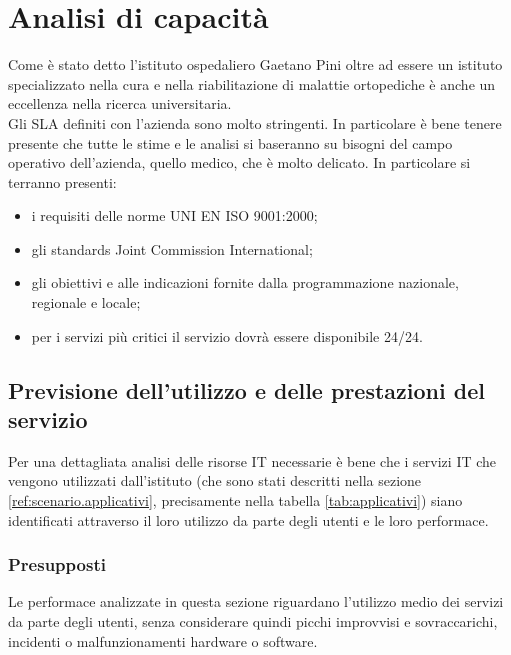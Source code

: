 \newpage
\section{Analisi di capacità} \label{ref:capacita}
Come è stato detto l'istituto ospedaliero Gaetano Pini oltre ad essere un istituto specializzato nella cura e nella riabilitazione di malattie ortopediche è anche un eccellenza nella ricerca universitaria. \\
Gli SLA definiti con l'azienda sono molto stringenti. In particolare è bene tenere presente che tutte le stime e le analisi si baseranno su bisogni del campo operativo dell'azienda, quello medico, che è molto delicato. In particolare si terranno presenti:
\begin{itemize}
	\item i requisiti delle norme UNI EN ISO 9001:2000;
	\item gli standards Joint Commission International;
	\item gli obiettivi e alle indicazioni fornite dalla programmazione nazionale, regionale e locale;
	\item per i servizi più critici il servizio dovrà essere disponibile 24/24.
\end{itemize}

\subsection{Previsione dell'utilizzo e delle prestazioni del servizio}
	Per una dettagliata analisi delle risorse IT necessarie è bene che i servizi IT che vengono utilizzati dall'istituto (che sono stati descritti nella sezione \ref{ref:scenario.applicativi}, precisamente nella tabella \ref{tab:applicativi}) siano identificati attraverso il loro utilizzo da parte degli utenti e le loro performace. \\

	\subsubsection{Presupposti}
	Le performace analizzate in questa sezione riguardano l'utilizzo medio dei servizi da parte degli utenti, senza considerare quindi picchi improvvisi e sovraccarichi, incidenti o malfunzionamenti hardware o software. \\

